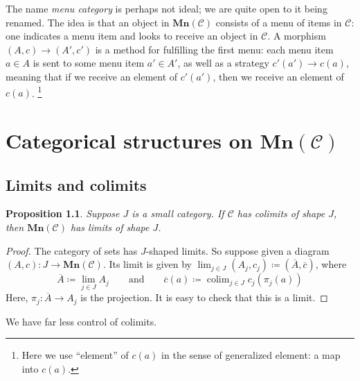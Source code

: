 \documentclass[11pt, one side, article]{memoir}
\theoremstyle{definition}
\theoremstyle{plain}
\newtheorem{proposition}[definitionx]{Proposition}
\DeclareMathOperator*{\colim}{colim}
\newcommand{\cat}[1]{\mathcal{#1}}%
\newcommand{\Cat}[1]{\mathbf{#1}}%
\newcommand{\ol}[1]{\overline{#1}}
\newcommand{\0}{\Cat{0}}
\newcommand{\1}{\Cat{1}}
\newcommand{\mn}{\Cat{Mn}}
\newcommand{\qqand}{\qquad\text{and}\qquad}
\begin{document}
The name \emph{menu category} is perhaps not ideal; we are quite open to it being renamed. The idea is that an object in $\mn(\cat{C})$ consists of a menu of items in $\cat{C}$: one indicates a menu item and looks to receive an object in $\cat{C}$. A morphism $(A,c)\to (A',c')$ is a method for fulfilling the first menu: each menu item $a\in A$ is sent to some menu item $a'\in A'$, as well as a strategy $c'(a')\to c(a)$, meaning that if we receive an element of $c'(a')$, then we receive an element of $c(a)$.%
\footnote{Here we use ``element'' of $c(a)$ in the sense of generalized element: a map into $c(a)$.}






\chapter{Categorical structures on $\mn(\cat{C})$}

\section{Limits and colimits}

\begin{proposition}\label{prop.colimits_to_limits}
Suppose $J$ is a small category. If $\cat{C}$ has colimits of shape $J$, then $\mn(\cat{C})$ has limits of shape $J$.
\end{proposition}
\begin{proof}
	The category of sets has $J$-shaped limits. So suppose given a diagram $(A,c)\colon J\to \mn(\cat{C})$. Its limit is given by $\lim_{j\in J}(A_j,c_j)\coloneqq(\ol{A},\ol{c})$, where
	\[
	\ol{A}\coloneqq\lim_{j\in J}A_j
	\qqand
	\ol{c}(a)\coloneqq\colim_{j\in J}c_j(\pi_j(a))
	\]
	Here, $\pi_j\colon \ol{A}\to A_j$ is the projection. It is easy to check that this is a limit.
\end{proof}

We have far less control of colimits.
\end{document}
